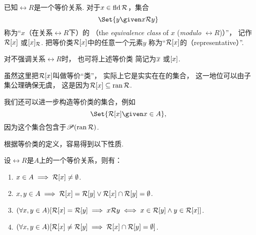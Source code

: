 \begin{definition}
已知\(\rel{R}\)是一个等价关系.
对于\(x \in \operatorname{fld} \mathcal{R}\)，集合\begin{equation*}
	\Set{ y \given x \rel{R} y }
\end{equation*}
称为“\(x\)（在关系\(\rel{R}\)下）的%
（the \emph{equivalence class} of \(x\) (\emph{modulo} \(\rel{R}\))）”，
记作\(\EquivalenceClassBH{x}[\rel{R}]\)
或\(\EquivalenceClassBT{x}[\rel{R}]\).
把等价类\(\EquivalenceClassBH{x}[\rel{R}]\)中的任意一个元素\(y\)
称为“\(\EquivalenceClassBH{x}[\rel{R}]\)的（representative）”.

对不强调关系\(\rel{R}\)时，
也可将上述等价类
简记为\(\EquivalenceClassO{x}\)
或\(\EquivalenceClassB{x}\).
\end{definition}

虽然这里把\(\EquivalenceClassBH{x}[\rel{R}]\)叫做等价“类”，
实际上它是实实在在的集合，
这一地位可以由子集公理确保无虞，
这是因为\(\EquivalenceClassBH{x}[\rel{R}] \subseteq \ran \rel{R}\).

我们还可以进一步构造等价类的集合，例如\begin{equation*}
	\Set{ \EquivalenceClassBH{x}[\rel{R}] \given x \in A },
\end{equation*}
因为这个集合包含于\(\mathscr{P}(\operatorname{ran} \mathcal{R})\).

根据等价类的定义，容易得到以下性质.
\begin{property}
设\(\rel{R}\)是\(A\)上的一个等价关系，则有：
\begin{enumerate}
	\item \(x \in A
	\implies \EquivalenceClassBH{x}[\rel{R}] \neq \emptyset\).

	\item \(x,y \in A
	\implies \EquivalenceClassBH{x}[\rel{R}] = \rel{R}[y]
	\lor \EquivalenceClassBH{x}[\rel{R}] \cap \rel{R}[y] = \emptyset\).

	\item \((\forall x,y \in A)
	[
		\EquivalenceClassBH{x}[\rel{R}] = \rel{R}[y]
		\implies
		x \rel{R} y
		\iff
		x \in \rel{R}[y] \land y \in \EquivalenceClassBH{x}[\rel{R}]
	]\).

	\item \((\forall x,y \in A)
	[
		\EquivalenceClassBH{x}[\rel{R}] \neq \rel{R}[y]
		\implies
		\EquivalenceClassBH{x}[\rel{R}] \cap \rel{R}[y] = \emptyset
	]\).
\end{enumerate}
\end{property}

